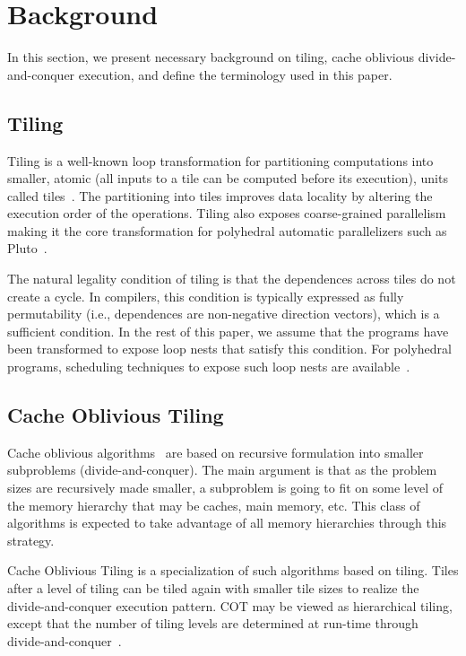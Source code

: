 \section{Background}
\label{sec:background}

In this section, we present necessary background on tiling, cache oblivious
divide-and-conquer execution, and define the terminology used in this paper.

\subsection{Tiling}
Tiling is a well-known loop transformation for partitioning computations into
smaller, atomic (all inputs to a tile can be computed before its execution),
units called tiles~\cite{irigoin-popl88, Wolf91tiling}. The partitioning into
tiles improves data locality by altering the execution order of the operations.
Tiling also exposes coarse-grained parallelism making it the core transformation
for polyhedral automatic parallelizers such as Pluto~\cite{uday-pldi08}.

 The natural legality condition of tiling is that the dependences across tiles do not
create a cycle.  In compilers, this condition is typically expressed as fully
permutability (i.e., dependences are non-negative direction vectors), which is
a sufficient condition. In the rest of this paper, we assume that the programs
have been transformed to expose loop nests that satisfy this condition.  For
polyhedral programs, scheduling techniques to expose such loop nests are
available~\cite{uday-pldi08}.

\subsection{Cache Oblivious Tiling}
Cache oblivious algorithms~\cite{prokop-thesis99, frigo-etal-focs99} are based
on recursive formulation into smaller subproblems (divide-and-conquer). The
main argument is that as the problem sizes are recursively made smaller, a
subproblem is going to fit on some level of the memory hierarchy that may be
caches, main memory, etc. This class of algorithms is expected to take
advantage of all memory hierarchies through this strategy.

Cache Oblivious Tiling is a specialization of such algorithms based on tiling.
Tiles after a level of tiling can be tiled again with smaller tile
sizes to realize the divide-and-conquer execution pattern. COT may be viewed as
hierarchical tiling, except that the number of tiling levels are determined at
run-time through divide-and-conquer~\cite{carter1995hierarchical}. 


